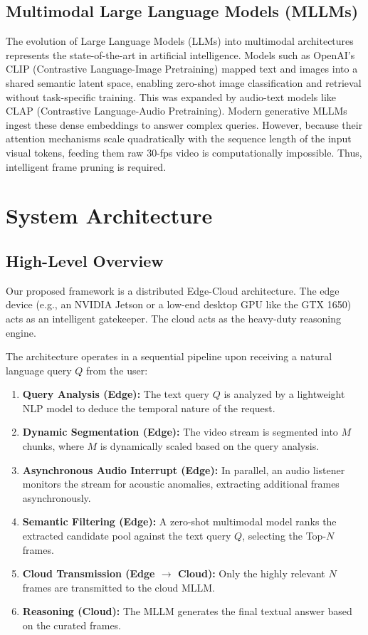 \documentclass[12pt, a4paper]{report}
\begin{document}
\section{Multimodal Large Language Models (MLLMs)}
The evolution of Large Language Models (LLMs) into multimodal architectures represents the state-of-the-art in artificial intelligence. Models such as OpenAI's CLIP (Contrastive Language-Image Pretraining) mapped text and images into a shared semantic latent space, enabling zero-shot image classification and retrieval without task-specific training. This was expanded by audio-text models like CLAP (Contrastive Language-Audio Pretraining). Modern generative MLLMs ingest these dense embeddings to answer complex queries. However, because their attention mechanisms scale quadratically with the sequence length of the input visual tokens, feeding them raw 30-fps video is computationally impossible. Thus, intelligent frame pruning is required.

\chapter{System Architecture}

\section{High-Level Overview}
Our proposed framework is a distributed Edge-Cloud architecture. The edge device (e.g., an NVIDIA Jetson or a low-end desktop GPU like the GTX 1650) acts as an intelligent gatekeeper. The cloud acts as the heavy-duty reasoning engine.

The architecture operates in a sequential pipeline upon receiving a natural language query $Q$ from the user:
\begin{enumerate}
    \item \textbf{Query Analysis (Edge):} The text query $Q$ is analyzed by a lightweight NLP model to deduce the temporal nature of the request.
    \item \textbf{Dynamic Segmentation (Edge):} The video stream is segmented into $M$ chunks, where $M$ is dynamically scaled based on the query analysis.
    \item \textbf{Asynchronous Audio Interrupt (Edge):} In parallel, an audio listener monitors the stream for acoustic anomalies, extracting additional frames asynchronously.
    \item \textbf{Semantic Filtering (Edge):} A zero-shot multimodal model ranks the extracted candidate pool against the text query $Q$, selecting the Top-$N$ frames.
    \item \textbf{Cloud Transmission (Edge $\rightarrow$ Cloud):} Only the highly relevant $N$ frames are transmitted to the cloud MLLM.
    \item \textbf{Reasoning (Cloud):} The MLLM generates the final textual answer based on the curated frames.
\end{enumerate}
\end{document}

